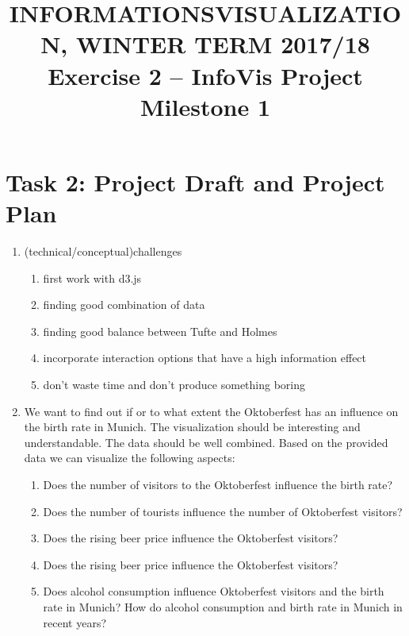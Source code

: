\documentclass[11pt, twoside, BCOR=8mm, DIV=12]{scrartcl}
\title{{\Large INFORMATIONSVISUALIZATION, WINTER TERM 2017/18} \\ Exercise 2 – InfoVis Project Milestone 1}
\begin{document}
\maketitle
\section*{Task 2: Project Draft and Project Plan}
\begin{enumerate}[label=\alph*)]
\item (technical/conceptual)challenges
\begin{enumerate}[label=\arabic*)]
\item first work with d3.js
\item finding good combination of data
\item finding good balance between Tufte and Holmes
\item incorporate interaction options that have a high information effect
\item don't waste time and don't produce something boring
\end{enumerate}
\item We want to find out if or to what extent the Oktoberfest has an influence on the birth rate in Munich.
The visualization should be interesting and understandable.
The data should be well combined.
Based on the provided data we can visualize the following aspects:
\begin{enumerate}[label=\arabic*)]
\item Does the number of visitors to the Oktoberfest influence the birth rate?
\item Does the number of tourists influence the number of Oktoberfest visitors?
\item Does the rising beer price influence the Oktoberfest visitors?
\item Does the rising beer price influence the Oktoberfest visitors?
\item Does alcohol consumption influence Oktoberfest visitors and the birth rate in Munich? How do alcohol consumption and birth rate in Munich in recent years?
\end{enumerate}
\end{enumerate}
\end{document}
